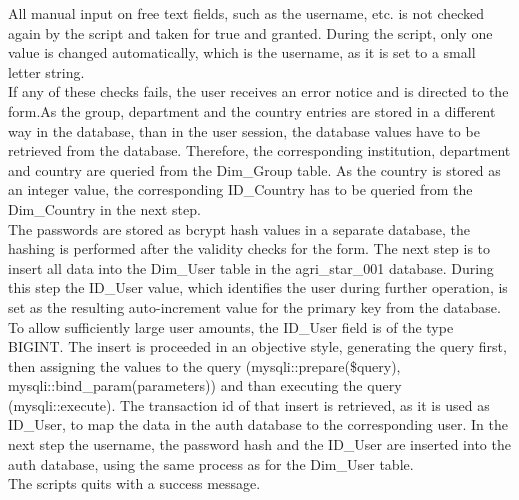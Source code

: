 All manual input on free text fields, such as the username, etc. is not checked again by the script and taken for true and granted. During the script, only one value is changed 
automatically, which is the username, as it is set to a small letter string.\\
If any of these checks fails, the user receives an error notice and is directed to the form.As the group, department and the country entries are stored in a different
way in the database, than in the user session, the database values have to be retrieved from the database. Therefore, the corresponding institution, department and country are 
queried from the Dim\_Group table. As the country is stored as an integer value, the corresponding ID\_Country has to be queried from the Dim\_Country in the next step.\\
The passwords are stored as bcrypt hash values in a separate database, the hashing is performed after the validity checks for the form. The next step is to insert all data into the 
Dim\_User table in the agri\_star\_001 database. During this step the ID\_User value, which identifies the user during further operation, is set as the resulting auto-increment 
value for the primary key from the database. To allow sufficiently large user amounts, the ID\_User field is of the type BIGINT. The insert is proceeded in an objective style, 
generating the query first, then assigning the values to the query (mysqli::prepare(\$query), mysqli::bind\_param(parameters)) and than executing the query (mysqli::execute). 
The transaction id of that insert is retrieved, as it is used as ID\_User, to map the data in the auth database to the corresponding user. 
In the next step the username, the password hash and the ID\_User are inserted into the auth database, using the same process as for the Dim\_User table.\\
The scripts quits with a success message.

\label{create_institution_script.php}
